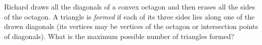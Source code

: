 Richard draws all the diagonals of a convex octagon and then erases all the sides of the octagon. A triangle is \emph{formed} if each of its three sides lies along one of the drawn diagonals (its vertices may be vertices of the octagon or intersection points of diagonals). What is the maximum possible number of triangles formed?
